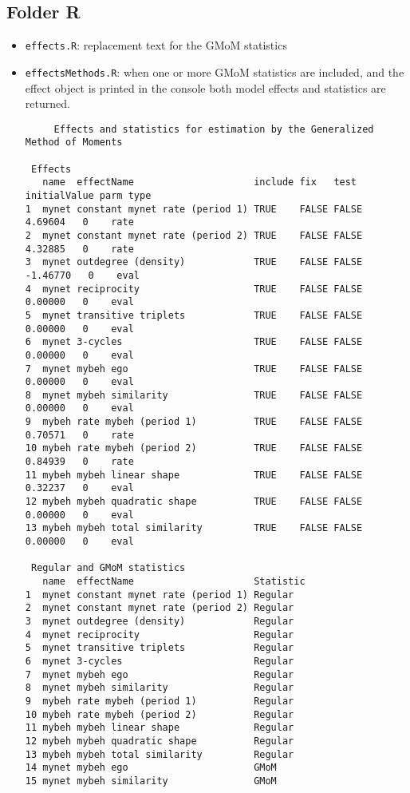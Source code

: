 \documentclass[a4paper,11pt]{article}
\begin{document}
\subsection*{Folder R}
\begin{itemize}
	\item \texttt{effects.R}: replacement text for the GMoM statistics 
	\smallskip
	\item \texttt{effectsMethods.R}: when one or more GMoM statistics are included, and the effect object is printed in the console both model effects and statistics are returned.  
		{\footnotesize
	\begin{verbatim}
	 Effects and statistics for estimation by the Generalized Method of Moments

 Effects
   name  effectName                     include fix   test  initialValue parm type
1  mynet constant mynet rate (period 1) TRUE    FALSE FALSE    4.69604   0    rate
2  mynet constant mynet rate (period 2) TRUE    FALSE FALSE    4.32885   0    rate
3  mynet outdegree (density)            TRUE    FALSE FALSE   -1.46770   0    eval
4  mynet reciprocity                    TRUE    FALSE FALSE    0.00000   0    eval
5  mynet transitive triplets            TRUE    FALSE FALSE    0.00000   0    eval
6  mynet 3-cycles                       TRUE    FALSE FALSE    0.00000   0    eval
7  mynet mybeh ego                      TRUE    FALSE FALSE    0.00000   0    eval
8  mynet mybeh similarity               TRUE    FALSE FALSE    0.00000   0    eval
9  mybeh rate mybeh (period 1)          TRUE    FALSE FALSE    0.70571   0    rate
10 mybeh rate mybeh (period 2)          TRUE    FALSE FALSE    0.84939   0    rate
11 mybeh mybeh linear shape             TRUE    FALSE FALSE    0.32237   0    eval
12 mybeh mybeh quadratic shape          TRUE    FALSE FALSE    0.00000   0    eval
13 mybeh mybeh total similarity         TRUE    FALSE FALSE    0.00000   0    eval

 Regular and GMoM statistics
   name  effectName                     Statistic
1  mynet constant mynet rate (period 1) Regular  
2  mynet constant mynet rate (period 2) Regular  
3  mynet outdegree (density)            Regular  
4  mynet reciprocity                    Regular  
5  mynet transitive triplets            Regular  
6  mynet 3-cycles                       Regular  
7  mynet mybeh ego                      Regular  
8  mynet mybeh similarity               Regular  
9  mybeh rate mybeh (period 1)          Regular  
10 mybeh rate mybeh (period 2)          Regular  
11 mybeh mybeh linear shape             Regular  
12 mybeh mybeh quadratic shape          Regular  
13 mybeh mybeh total similarity         Regular  
14 mynet mybeh ego                      GMoM     
15 mynet mybeh similarity               GMoM    
	\end{verbatim}}


\end{itemize}
\end{document}
